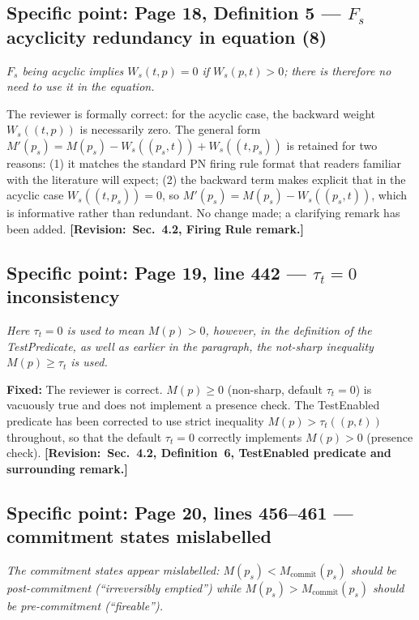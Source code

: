 \documentclass[11pt,letterpaper]{article}
\newcommand{\rquote}[1]{\begin{mdframed}[style=reviewquote]\textit{#1}\end{mdframed}}
\newcommand{\sref}[1]{\textbf{[Revision:~#1]}}
\newcommand{\fixed}[1]{\textcolor{blue!70!black}{\textbf{Fixed:} #1}}
\begin{document}
\subsection*{Specific point: Page 18, Definition 5 --- $F_s$ acyclicity
redundancy in equation (8)}

\rquote{$F_s$ being acyclic implies $W_s(t,p) = 0$ if $W_s(p,t) > 0$;
there is therefore no need to use it in the equation.}

The reviewer is formally correct: for the acyclic case, the backward weight
$W_s((t,p))$ is necessarily zero.
The general form $M'(p_s) = M(p_s) - W_s((p_s,t)) + W_s((t,p_s))$ is
retained for two reasons: (1) it matches the standard PN firing rule format
that readers familiar with the literature will expect; (2) the backward term
makes explicit that in the acyclic case $W_s((t,p_s)) = 0$, so
$M'(p_s) = M(p_s) - W_s((p_s,t))$, which is informative rather than redundant.
No change made; a clarifying remark has been added. \sref{Sec.~4.2, Firing
Rule remark.}

\subsection*{Specific point: Page 19, line 442 --- $\tau_t = 0$ inconsistency}

\rquote{Here $\tau_t = 0$ is used to mean $M(p) > 0$, however, in the
definition of the TestPredicate, as well as earlier in the paragraph, the
not-sharp inequality $M(p) \geq \tau_t$ is used.}

\fixed{The reviewer is correct.
$M(p) \geq 0$ (non-sharp, default $\tau_t = 0$) is vacuously true and does
not implement a presence check.
The TestEnabled predicate has been corrected to use strict inequality
$M(p) > \tau_t((p,t))$ throughout, so that the default $\tau_t = 0$
correctly implements $M(p) > 0$ (presence check).
\sref{Sec.~4.2, Definition~6, TestEnabled predicate and surrounding remark.}}

\subsection*{Specific point: Page 20, lines 456--461 --- commitment states
mislabelled}

\rquote{The commitment states appear mislabelled: $M(p_s) < M_{\mathrm{commit}}(p_s)$
should be post-commitment (``irreversibly emptied'') while
$M(p_s) > M_{\mathrm{commit}}(p_s)$ should be pre-commitment (``fireable'').}
\end{document}
